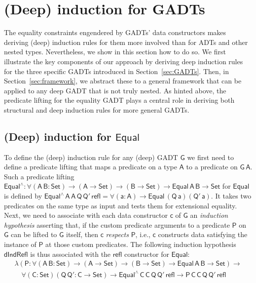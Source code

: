 \documentclass[9pt]{entcs}
\begin{document}
\section{(Deep) induction for GADTs}\label{sec:deep-ind-GADTs}

The equality constraints engendered by GADTs' data constructors makes
deriving (deep) induction rules for them more involved than for ADTs
and other nested types. Nevertheless, we show in this section how to
do so. We first illustrate the key components of our approach by
deriving deep induction rules for the three specific GADTs introduced
in Section~\ref{sec:GADTs}. Then, in Section~\ref{sec:framework}, we
abstract these to a general framework that can be applied to any deep
GADT that is not truly nested. As hinted above, the predicate lifting
for the equality GADT plays a central role in deriving both structural
and deep induction rules for more general GADTs.
 
\subsection{(Deep) induction for $\mathsf{Equal}$}\label{sec:ind-equal}

To define the (deep) induction rule for any (deep) GADT $\mathsf{G}$
we first need to define a predicate lifting that maps a predicate on
a type $\mathsf{A}$ to a predicate on $\mathsf{G\,A}$. Such a predicate
lifting $\mathsf{Equal^{\wedge} : \forall (A\,B : Set) \to (A \to Set)
  \to (B \to Set) \to Equal\,A\,B \to Set}$ for $\mathsf{Equal}$ is
defined by $\mathsf{Equal^{\wedge}\,A\,A\,Q\,Q'\,refl = \forall (a :
  A) \to Equal\,(Q\,a)(Q'\,a)}$.  It takes two predicates on the same
type as input and tests them for extensional equality.
%
Next, we need to associate with each data constructor $\mathsf{c}$ of
$\mathsf{G}$ an {\em induction hypothesis} asserting that, if the
custom predicate arguments to a predicate $\mathsf{P}$ on $\mathsf{G}$
can be lifted to $\mathsf{G}$ itself, then $\mathsf{c}$ {\em respects}
$\mathsf{P}$, i.e., $\mathsf{c}$ constructs data satisfying the
instance of $\mathsf{P}$ at those custom predicates. The following
induction hypothesis $\mathsf{dIndRefl}$ is thus associated with the
$\mathsf{refl}$ constructor for $\mathsf{Equal}$:
\begin{equation*}\label{eq:ind-refl}
\begin{array}{l}
\mathsf{\lambda (P : \forall (A\,B : Set) \to (A \to Set) \to (B \to
  Set) \to Equal\,A\,B \to Set) \to} \\ 
\quad\mathsf{\forall (C : Set) (Q\, Q' : C \to Set) \to
  Equal^{\wedge}\,C\,C\,Q\,Q'\,refl \to P\,C\,C\,Q\,Q'\,refl} 
\end{array}
\end{equation*}
\end{document}
